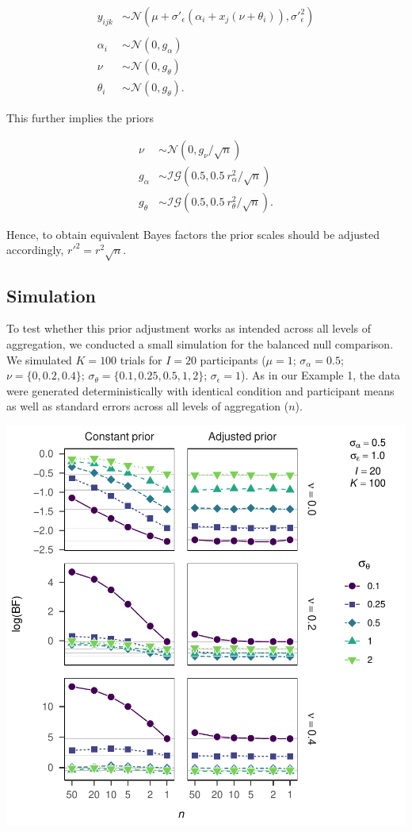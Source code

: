 \documentclass[
  a4paper,
  DIV=11,
  numbers=noendperiod,
  oneside]{scrartcl}
\begin{document}
\[
\begin{aligned}
y_{ijk} & \sim \mathcal{N}(\mu + \sigma\prime_\epsilon (\alpha_i + x_j (\nu + \theta_i)), \sigma\prime_\epsilon^{2}) \\ & \\
\alpha_i & \sim \mathcal{N}(0, g_\alpha) \\
\nu & \sim \mathcal{N}(0, g_\theta) \\
\theta_i & \sim \mathcal{N}(0, g_\theta).
\end{aligned}
\]

This further implies the priors

\[
\begin{aligned}
\nu & \sim \mathcal{N}(0, g_{\nu}/\sqrt{n}) \\
g_\alpha & \sim \mathcal{IG}(0.5, 0.5~r^2_{\alpha}/\sqrt{n}) \\
g_\theta & \sim\mathcal{IG}(0.5, 0.5~r^2_{\theta}/\sqrt{n}).
\end{aligned}
\]

Hence, to obtain equivalent Bayes factors the prior scales should be
adjusted accordingly, \(r\prime^2 = r^2 \sqrt{n}\).

\hypertarget{simulation}{%
\subsection{Simulation}\label{simulation}}

To test whether this prior adjustment works as intended across all
levels of aggregation, we conducted a small simulation for the balanced
null comparison. We simulated \(K = 100\) trials for \(I = 20\)
participants (\(\mu = 1\); \(\sigma_\alpha = 0.5\);
\(\nu = \{0, 0.2, 0.4\}\); \(\sigma_\theta = \{0.1, 0.25, 0.5, 1, 2\}\);
\(\sigma_\epsilon = 1\)). As in our Example 1, the data were generated
deterministically with identical condition and participant means as well
as standard errors across all levels of aggregation (\(n\)).

\includegraphics{prior_translation_files/figure-pdf/unnamed-chunk-3-1.pdf}
\end{document}
